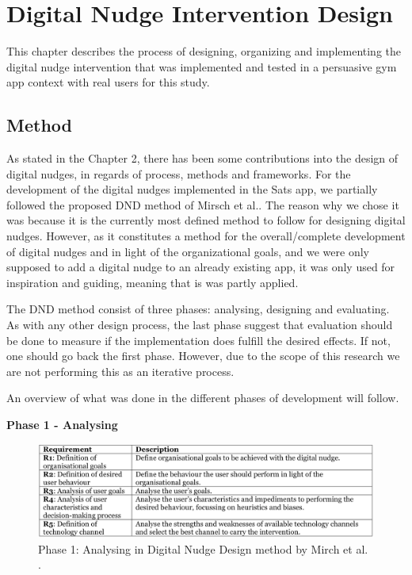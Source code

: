 \chapter{Digital Nudge Intervention Design}
This chapter describes the process of designing, organizing and implementing the digital nudge intervention that was implemented and tested in a persuasive gym app context with real users for this study. 

\section{Method} 
As stated in the Chapter 2, there has been some contributions into the design of digital nudges, in regards of process, methods and frameworks. For the development of the digital nudges implemented in the Sats app, we partially followed the proposed DND method of Mirsch et al.\cite{mirsch_making_2018}. The reason why we chose it was because it is the currently most defined method to follow for designing digital nudges. However, as it constitutes a method for the overall/complete development of digital nudges and in light of the organizational goals, and we were only supposed to add a digital nudge to an already existing app, it was only used for inspiration and guiding, meaning that is was partly applied. 

The DND method consist of three phases: analysing, designing and evaluating. As with any other design process, the last phase suggest that evaluation should be done to measure if the implementation does fulfill the desired effects. If not, one should go back the first phase. However, due to the scope of this research we are not performing this as an iterative process. 

An overview of what was done in the different phases of development will follow. 

\bigbreak

\textbf{Phase 1 - Analysing}

\bigbreak
\begin{figure}
\includegraphics[width=1\textwidth]{images/Phase1.png}
\caption{Phase 1: Analysing in Digital Nudge Design method by Mirch et al. \cite{mirsch_making_2018}.}
\end{figure}
\bigbreak


